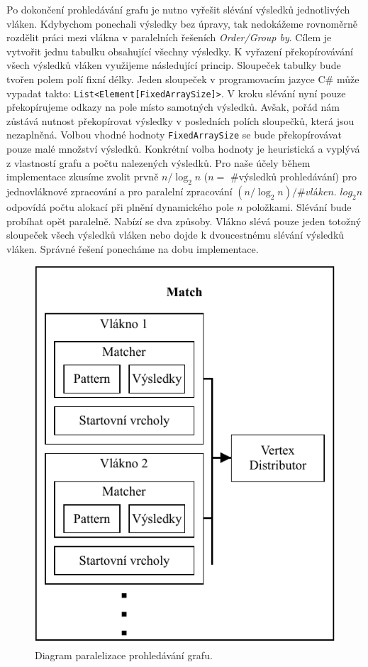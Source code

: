 Po dokončení prohledávání grafu je nutno vyřešit slévání výsledků jednotlivých vláken.
Kdybychom ponechali výsledky bez úpravy, tak nedokážeme rovnoměrně rozdělit práci mezi vlákna v paralelních řešeních \textit{Order/Group by}.
Cílem je vytvořit jednu tabulku obsahující všechny výsledky.
K vyřazení překopírovávání všech výsledků vláken využijeme následující princip.
Sloupeček tabulky bude tvořen polem polí fixní délky.
Jeden sloupeček v programovacím jazyce C\# může vypadat takto: \texttt{List<Element[FixedArraySize]>}.
V kroku slévání nyní pouze překopírujeme odkazy na pole místo samotných výsledků.
Avšak, pořád nám zůstává nutnost překopírovat výsledky v posledních polích sloupečků, která jsou nezaplněná.
Volbou vhodné hodnoty \texttt{FixedArraySize} se bude překopírovávat pouze malé množství výsledků.
Konkrétní volba hodnoty je heuristická a vyplývá z vlastností grafu a počtu nalezených výsledků.
Pro naše účely během implementace zkusíme zvolit prvně $n/\log_2 n$ ($n = $ \#výsledků prohledávání) pro jednovláknové zpracování a pro paralelní zpracování $(n/\log_2 n)/\#vláken$.
$log_2 n$ odpovídá počtu alokací při plnění dynamického pole $n$ položkami.
Slévání bude probíhat opět paralelně.
Nabízí se dva způsoby.
Vlákno slévá pouze jeden totožný sloupeček všech výsledků vláken nebo dojde k dvoucestnému slévání výsledků vláken.
Správné řešení ponecháme na dobu implementace.    

\clearpage

\begin{figure}[!htp]
\includegraphics{../img/diaQueryObjectsMatchPar.pdf}\centering
\caption{Diagram paralelizace prohledávání grafu.}
\label{figure.diaQueryObjectsMatchPar}
\end{figure}

